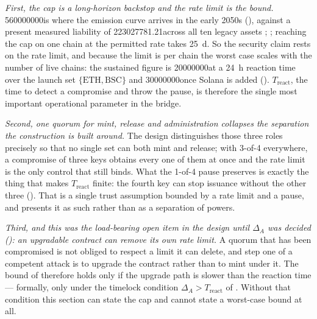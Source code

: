\emph{First, the cap is a long-horizon backstop and the rate limit is the bound.}
\num{560000000}\flux is where the emission curve arrives in the early 2050s
(), against a present measured liability of \num{223027781.21}\flux across
all ten legacy assets ;
; reaching the cap on one
chain at the permitted rate takes \SI{25}{\day}. So the security claim rests on the rate limit, and
because the limit is per chain the worst case scales with the number of live chains: the sustained
figure is \num{20000000}\flux at a \SI{24}{\hour} reaction time over the launch set
$\{\mathrm{ETH}, \mathrm{BSC}\}$ and \num{30000000}\flux once Solana is added
(). $T_{\mathrm{react}}$, the time to detect a compromise and throw the pause,
is therefore the single most important operational parameter in the bridge.

\emph{Second, one quorum for mint, release and administration collapses the separation the
construction is built around.} The design distinguishes those three roles precisely so that no
single set can both mint and release; with 3-of-4 everywhere, a compromise of three keys obtains
every one of them at once and the rate limit is the only control that still binds. What the 1-of-4
pause preserves is exactly the thing that makes $T_{\mathrm{react}}$ finite: the fourth key can stop
issuance without the other three (). That is a single trust assumption bounded by a
rate limit and a pause, and  presents it as such rather than as a
separation of powers.

\emph{Third, and this was the load-bearing open item in the design until $\Delta_A$ was decided
(): an upgradable contract can remove its own rate limit.} A quorum that has been compromised is not obliged to respect a limit it can
delete, and step one of a competent attack is to upgrade the contract rather than to mint under it.
The bound of  therefore holds only if the upgrade path is slower than the
reaction time --- formally, only under the timelock condition $\Delta_A > T_{\mathrm{react}}$ of
. Without that condition this section can state the cap and cannot state a
worst-case bound at all. \planned

